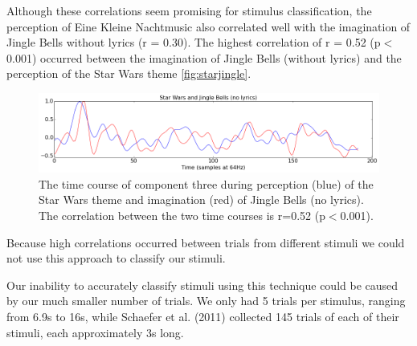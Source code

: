 Although these correlations seem promising for stimulus classification, the perception of Eine Kleine Nachtmusic also correlated well with the imagination of Jingle Bells without lyrics (r = 0.30). 
The highest correlation of r = 0.52 (p$<$0.001) occurred between the imagination of Jingle Bells (without lyrics) and the perception of the Star Wars theme \autoref{fig:starjingle}.
\begin{figure}[htbp]
  \centerline{\includegraphics[scale=0.4]{Figures/StarJingle}}
  \caption{The time course of component three during perception (blue) of the Star Wars theme and imagination (red) of Jingle Bells (no lyrics). The correlation between the two time courses is r=0.52 (p$<$0.001).}
  \label{fig:starjingle}
\end{figure}
Because high correlations occurred between trials from different stimuli we could not use this approach to classify our stimuli.

Our inability to accurately classify stimuli using this technique could be caused by our much smaller number of trials.
We only had 5 trials per stimulus, ranging from 6.9s to 16s, while Schaefer et al. (2011) collected 145 trials of each of their stimuli, each approximately 3s long.